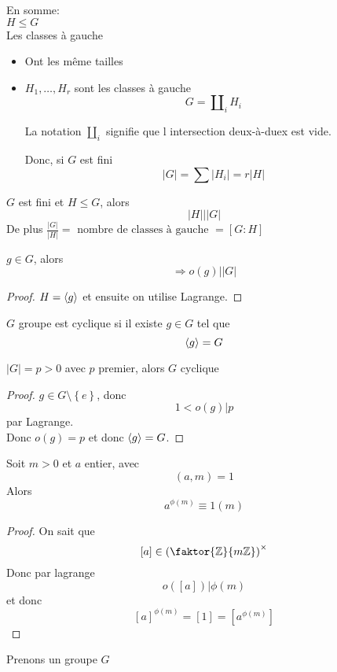 \documentclass[../main.tex]{subfiles}
\begin{document}
En somme:\\
$H \leq G$ \\
Les classes à gauche 
\begin{itemize}
\item Ont les même tailles


\item $H_1,\ldots, H_r$ sont les classes à gauche
	\[ 
	G = \amalg_i H_{i} 
	\]

	La notation $\amalg_i$ signifie que l intersection deux-à-duex est vide.
	

	Donc, si $G$ est fini
	\[ 
	|G| = \sum |H_i| = r|H|
	\]
\end{itemize}
\begin{thm}[Lagrange]
	$G$ est fini et $H\leq G$, alors
	\[ 
	|H| \big\vert |G|
	\]
	De plus $\frac{|G|}{|H|}= \text{ nombre de classes à gauche } = [ G: H] $
	
\end{thm}
\begin{crly}
$g \in G$, alors
\[ 
	\Rightarrow o( g) \big\vert |G|
\]

\end{crly}
\begin{proof}
	$H = \left\langle g\right\rangle$ et ensuite on utilise Lagrange.
\end{proof}
\begin{defn}
$G$ groupe est cyclique si il existe $g \in G$ tel que 
\[ 
	\left\langle g\right\rangle = G
\]

\end{defn}
\begin{crly}
$|G| = p > 0$ avec $p$ premier, alors $G$ cyclique
\end{crly}
\begin{proof}
$g \in G \setminus \left\{ e  \right\} $, donc
\[ 
	1 < o( g)  | p
\]
par Lagrange.\\
Donc $o( g) = p $ et donc $\left\langle g\right\rangle = G$.
\end{proof}
\begin{thm}\label{thm:petit_theoreme_de_fermat}
	Soit $m> 0$ et $a$ entier, avec
	\[ 
		( a,m) =1
	\]
	Alors 
	\[ 
		a^{\phi( m) }\equiv 1 ( m) 
	\]
	
\end{thm}
\begin{proof}
On sait que
\[ 
	[ a]  \in \left( \faktor { \mathbb{Z}} { m \mathbb{Z}} \right) ^{\times}
\]
Donc par lagrange
\[ 
	o( [ a] ) | \phi( m) 
\]
et donc
\[ 
	[ a] ^{\phi( m) } = [ 1] = [ a^{\phi( m) }] 
\]

\end{proof}
Prenons un groupe $G$
\end{document}
